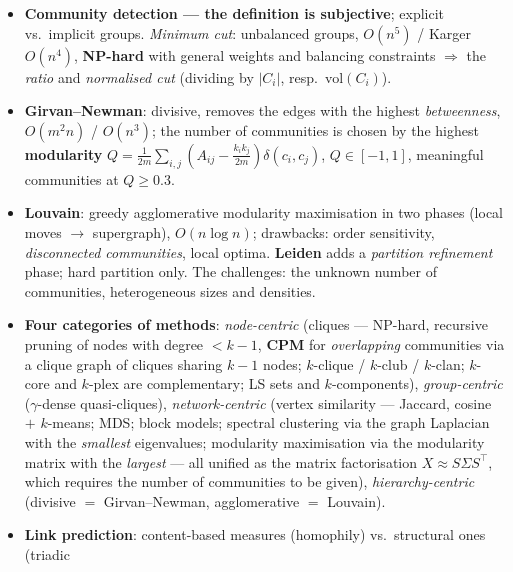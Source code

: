\documentclass[11pt,a4paper]{article}
\theoremstyle{definition}
\begin{document}
\begin{itemize}
      \emph{overlap}, a hierarchy of sub-communities. \emph{Bipartite cores} --- an $(i,j)$-core, fans
      $=$ hubs, centers $=$ authorities; pruning $+$ core generation; it finds only the cores, neither
      the themes nor the hierarchy. \emph{Named entity communities}: a graph from co-occurrences in a
      sentence $\to$ triangles $\to$ cores $\to$ clustering by textual similarity.
\item \textbf{Community detection --- the definition is subjective}; explicit vs.\ implicit groups.
      \emph{Minimum cut}: unbalanced groups, $O(n^5)$ / Karger $O(n^4)$, \textbf{NP-hard} with general
      weights and balancing constraints $\Rightarrow$ the \emph{ratio} and \emph{normalised cut}
      (dividing by $|C_i|$, resp.\ $\mathrm{vol}(C_i)$).
\item \textbf{Girvan--Newman}: divisive, removes the edges with the highest \emph{betweenness},
      $O(m^2n)$ / $O(n^3)$; the number of communities is chosen by the highest \textbf{modularity}
      $Q=\frac{1}{2m}\sum_{i,j}(A_{ij}-\frac{k_ik_j}{2m})\delta(c_i,c_j)$, $Q\in[-1,1]$, meaningful
      communities at $Q\ge 0.3$.
\item \textbf{Louvain}: greedy agglomerative modularity maximisation in two phases (local moves $\to$
      supergraph), $O(n\log n)$; drawbacks: order sensitivity, \emph{disconnected communities}, local
      optima. \textbf{Leiden} adds a \emph{partition refinement} phase; hard partition only. The
      challenges: the unknown number of communities, heterogeneous sizes and densities.
\item \textbf{Four categories of methods}: \emph{node-centric} (cliques --- NP-hard, recursive pruning
      of nodes with degree $<k-1$, \textbf{CPM} for \emph{overlapping} communities via a clique graph
      of cliques sharing $k-1$ nodes; $k$-clique / $k$-club / $k$-clan; $k$-core and $k$-plex are
      complementary; LS sets and $k$-components), \emph{group-centric} ($\gamma$-dense quasi-cliques),
      \emph{network-centric} (vertex similarity --- Jaccard, cosine $+$ $k$-means; MDS; block models;
      spectral clustering via the graph Laplacian with the \emph{smallest} eigenvalues; modularity
      maximisation via the modularity matrix with the \emph{largest} --- all unified as the matrix
      factorisation $X\approx S\Sigma S^{\!\top}$, which requires the number of communities to be
      given), \emph{hierarchy-centric} (divisive $=$ Girvan--Newman, agglomerative $=$ Louvain).
\item \textbf{Link prediction}: content-based measures (homophily) vs.\ structural ones (triadic

\end{itemize}
\end{document}
